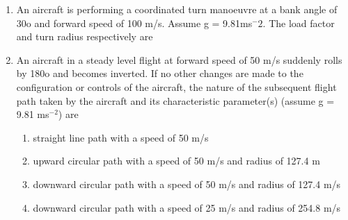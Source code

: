 \documentclass[journal,12pt,onecolumn]{IEEEtran}
\theoremstyle{remark}
\begin{document}
\begin{enumerate}
\item An aircraft is performing a coordinated turn manoeuvre at a bank angle of 30o and forward speed of
100 m/s. Assume g = 9.81ms$^-2$. The load factor and turn radius respectively are
\begin{enumerate}
\end{enumerate}

\item An aircraft in a steady level flight at forward speed of 50 m/s suddenly rolls by 180o and becomes
inverted. If no other changes are made to the configuration or controls of the aircraft, the nature of
the subsequent flight path taken by the aircraft and its characteristic parameter(s) (assume g = 9.81
ms$^{-2}$) are
\begin{enumerate}
 
     \item straight line path with a speed of 50 m/s
     \item upward circular path with a speed of 50 m/s and radius of            		   127.4 m
     \item downward circular path with a speed of 50 m/s and radius of 				   127.4 m/s
     \item downward circular path with a speed of 25 m/s and radius of       	       254.8 m/s
\end{enumerate}


\end{enumerate}
\end{document}
